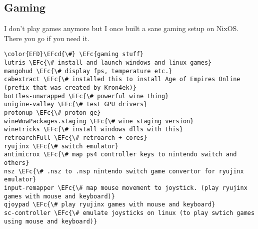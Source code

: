 \documentclass[14pt]{article}
\newcommand{\EFc}[1]{\textcolor{EFc}{#1}} %
\newcommand{\EFcd}[1]{\textcolor{EFcd}{#1}} %
\begin{document}
\subsection{Gaming}
\label{sec:org09aac10}
I don't play games anymore but I once built a sane gaming setup on NixOS. There you go if you need it.
\begin{Code}
\begin{Verbatim}
\color{EFD}\EFcd{\#} \EFc{gaming stuff}
lutris \EFc{\# install and launch windows and linux games}
mangohud \EFc{\# display fps, temperature etc.}
cabextract \EFc{\# installed this to install Age of Empires Online (prefix that was created by Kron4ek)}
bottles-unwrapped \EFc{\# powerful wine thing}
unigine-valley \EFc{\# test GPU drivers}
protonup \EFc{\# proton-ge}
wineWowPackages.staging \EFc{\# wine staging version}
winetricks \EFc{\# install windows dlls with this}
retroarchFull \EFc{\# retroarch + cores}
ryujinx \EFc{\# switch emulator}
antimicrox \EFc{\# map ps4 controller keys to nintendo switch and others}
nsz \EFc{\# .nsz to .nsp nintendo switch game convertor for ryujinx emulator}
input-remapper \EFc{\# map mouse movement to joystick. (play ryujinx games with mouse and keyboard)}
qjoypad \EFc{\# play ryujinx games with mouse and keyboard}
sc-controller \EFc{\# emulate joysticks on linux (to play swtich games using mouse and keyboard)}
\end{Verbatim}
\end{Code}
\end{document}

